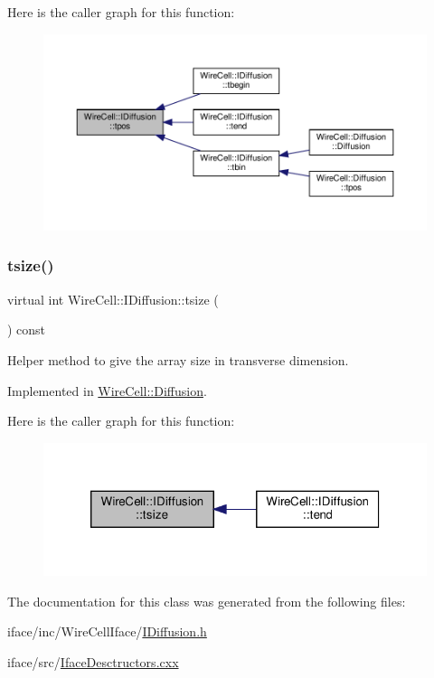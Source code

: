 Here is the caller graph for this function\+:
\nopagebreak
\begin{figure}[H]
\begin{center}
\leavevmode
\includegraphics[width=350pt]{class_wire_cell_1_1_i_diffusion_a0f9fd1a277828333fa08f77fd9a6315d_icgraph}
\end{center}
\end{figure}
\mbox{\label{class_wire_cell_1_1_i_diffusion_affce6824ad0e746270f0b6b27177584e}} 
\subsubsection{\texorpdfstring{tsize()}{tsize()}}
{\footnotesize\ttfamily virtual int Wire\+Cell\+::\+I\+Diffusion\+::tsize (\begin{DoxyParamCaption}{ }\end{DoxyParamCaption}) const\hspace{0.3cm}{\ttfamily [pure virtual]}}



Helper method to give the array size in transverse dimension. 



Implemented in \hyperlink{class_wire_cell_1_1_diffusion_a0833d46be2aba6c268fef7dbd7fc2245}{Wire\+Cell\+::\+Diffusion}.

Here is the caller graph for this function\+:
\nopagebreak
\begin{figure}[H]
\begin{center}
\leavevmode
\includegraphics[width=320pt]{class_wire_cell_1_1_i_diffusion_affce6824ad0e746270f0b6b27177584e_icgraph}
\end{center}
\end{figure}


The documentation for this class was generated from the following files\+:\begin{DoxyCompactItemize}
\item 
iface/inc/\+Wire\+Cell\+Iface/\hyperlink{_i_diffusion_8h}{I\+Diffusion.\+h}\item 
iface/src/\hyperlink{_iface_desctructors_8cxx}{Iface\+Desctructors.\+cxx}\end{DoxyCompactItemize}
